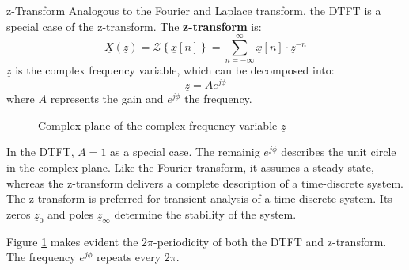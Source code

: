 \begin{refsection}
\begin{excursus}{z-Transform}
	Analogous to the Fourier and Laplace transform, the \acf{DTFT} is a special case of the z-transform. The  \textbf{z-transform} is:
	\begin{equation}
		\underline{X}\left(\underline{z}\right) = \mathcal{Z}\left\{\underline{x}[n]\right\} = \sum\limits_{n = -\infty}^{\infty} \underline{x}[n] \cdot \underline{z}^{-n}
	\end{equation}
	$\underline{z}$ is the complex frequency variable, which can be decomposed into:
	\begin{equation}
		\underline{z} = A e^{j \phi}
	\end{equation}
	where $A$ represents the gain and $e^{j \phi}$ the frequency.
	\begin{figure}[H]
		\centering
		\caption{Complex plane of the complex frequency variable $\underline{z}$}
		\label{fig:ch04:ztrafo_z_cmplx_plane}
	\end{figure}
	
	In the \acf{DTFT}, $A = 1$ as a special case. The remainig $e^{j \phi}$ describes the unit circle in the complex plane. Like the Fourier transform, it assumes a steady-state, whereas the z-transform delivers a complete description of a time-discrete system. The z-transform is preferred for transient analysis of a time-discrete system. Its zeros $\underline{z}_0$ and poles $\underline{z}_\infty$ determine the stability of the system.
	
	\vspace{0.5em}
	
	Figure \ref{fig:ch04:ztrafo_z_cmplx_plane} makes evident the $2 \pi$-periodicity of both the \ac{DTFT} and z-transform. The frequency $e^{j \phi}$ repeats every $2 \pi$.
\end{excursus}


\end{refsection}
